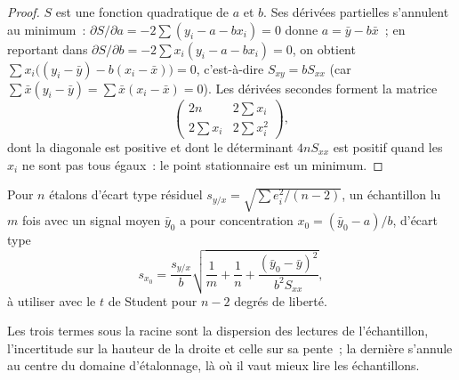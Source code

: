\begin{proof}
$S$ est une fonction quadratique de $a$ et $b$. Ses dérivées partielles s'annulent au minimum~:
$\partial S/\partial a = -2\sum(y_i - a - bx_i) = 0$ donne $a = \bar y - b\bar x$~; en reportant dans
$\partial S/\partial b = -2\sum x_i(y_i - a - bx_i) = 0$, on obtient $\sum x_i\bigl((y_i - \bar y) - b(x_i -
\bar x)\bigr) = 0$, c'est-à-dire $S_{xy} = bS_{xx}$ (car $\sum \bar x(y_i - \bar y) = \sum \bar x(x_i - \bar
x) = 0$). Les dérivées secondes forment la matrice
\[\begin{pmatrix} 2n & 2\sum x_i\\ 2\sum x_i & 2\sum x_i^2\end{pmatrix},\]
dont la diagonale est positive et dont le déterminant $4nS_{xx}$ est positif quand les $x_i$ ne sont pas
tous égaux~: le point stationnaire est un minimum.
\end{proof}

\begin{proposition}\label{prop:b2:measurement-statistics:interpolation}
Pour $n$ étalons d'écart type résiduel $s_{y/x} = \sqrt{\sum e_i^2/(n-2)}$, un échantillon lu
$m$ fois avec un signal moyen $\bar y_0$ a pour concentration $x_0 = (\bar y_0 - a)/b$, d'écart type
\begin{equation*}
s_{x_0} = \frac{s_{y/x}}{b}\sqrt{\frac1m + \frac1n + \frac{(\bar y_0 - \bar y)^2}{b^2S_{xx}}},
\end{equation*}
à utiliser avec le $t$ de Student pour $n - 2$ degrés de liberté.
\end{proposition}

\admitted

Les trois termes sous la racine sont la dispersion des lectures de l'échantillon, l'incertitude sur la
hauteur de la droite et celle sur sa pente~; la dernière s'annule au centre du domaine d'étalonnage, là
où il vaut mieux lire les échantillons.

